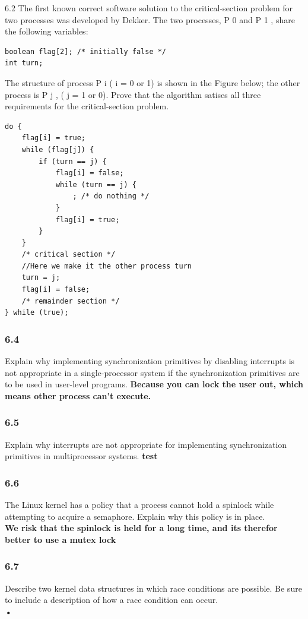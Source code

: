 \documentclass[a4paper,10pt,titlepage]{report}
\begin{document}
6.2 The first known correct software solution to the critical-section problem for two processes was developed by Dekker. The two processes, P 0 and P 1 , share the following variables:
\begin{lstlisting}[frame=single]
boolean flag[2]; /* initially false */
int turn;
\end{lstlisting}
The structure of process P i ( i = 0 or 1) is shown in the Figure below; the other process is P j , ( j = 1 or 0). Prove that the algorithm satises all three requirements for the critical-section problem.\\
\begin{lstlisting}[frame=single]
do {
    flag[i] = true;
    while (flag[j]) {
        if (turn == j) {
            flag[i] = false;
            while (turn == j) {
                ; /* do nothing */
            }
            flag[i] = true;
        }
    }
    /* critical section */
    //Here we make it the other process turn
    turn = j;
    flag[i] = false;
    /* remainder section */
} while (true);

\end{lstlisting}

\subsubsection{6.4} 
Explain why implementing synchronization primitives by disabling interrupts is not appropriate in a single-processor system if the synchronization primitives are to be used in user-level programs.
\textbf{Because you can lock the user out, which means other process can't execute.}
\\
\subsubsection{6.5} 
Explain why interrupts are not appropriate for implementing synchronization primitives in multiprocessor systems.
\textbf{test}
\\
\subsubsection{6.6} 
The Linux kernel has a policy that a process cannot hold a spinlock while attempting to acquire a semaphore. Explain why this policy is in place.\\
\textbf{We risk that the spinlock is held for a long time, and its therefor better to use a mutex lock}
\\
\subsubsection{6.7}
Describe two kernel data structures in which race conditions are possible. Be sure to include a description of how a race condition can occur.\\
\textbf{•}
\\
\end{document}
